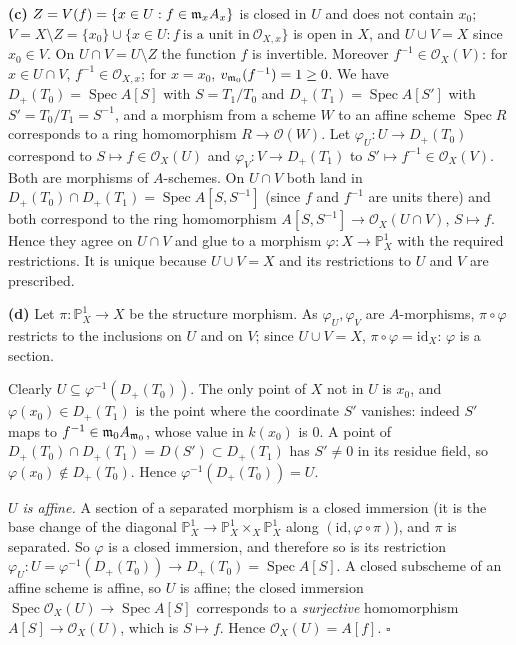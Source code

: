 \documentclass[11pt]{article}
\begin{document}
\textbf{(c)} $Z=V(f)=\{x\in U:f\in\mathfrak m_xA_x\}$ is closed in $U$ and does not contain $x_0$; $V=X\setminus Z=\{x_0\}\cup\{x\in U:f\ \text{is a unit in}\ \mathcal O_{X,x}\}$ is open in $X$, and $U\cup V=X$ since $x_0\in V$. On $U\cap V=U\setminus Z$ the function $f$ is invertible. Moreover $f^{-1}\in\mathcal O_X(V)$: for $x\in U\cap V$, $f^{-1}\in\mathcal O_{X,x}$; for $x=x_0$, $v_{\mathfrak m_0}(f^{-1})=1\ge0$. We have $D_+(T_0)=\operatorname{Spec}A[S]$ with $S=T_1/T_0$ and $D_+(T_1)=\operatorname{Spec}A[S']$ with $S'=T_0/T_1=S^{-1}$, and a morphism from a scheme $W$ to an affine scheme $\operatorname{Spec}R$ corresponds to a ring homomorphism $R\to\mathcal O(W)$. Let $\varphi_U:U\to D_+(T_0)$ correspond to $S\mapsto f\in\mathcal O_X(U)$ and $\varphi_V:V\to D_+(T_1)$ to $S'\mapsto f^{-1}\in\mathcal O_X(V)$. Both are morphisms of $A$-schemes. On $U\cap V$ both land in $D_+(T_0)\cap D_+(T_1)=\operatorname{Spec}A[S,S^{-1}]$ (since $f$ and $f^{-1}$ are units there) and both correspond to the ring homomorphism $A[S,S^{-1}]\to\mathcal O_X(U\cap V)$, $S\mapsto f$. Hence they agree on $U\cap V$ and glue to a morphism $\varphi:X\to\mathbb P^1_X$ with the required restrictions. It is unique because $U\cup V=X$ and its restrictions to $U$ and $V$ are prescribed.

\textbf{(d)} Let $\pi:\mathbb P^1_X\to X$ be the structure morphism. As $\varphi_U,\varphi_V$ are $A$-morphisms, $\pi\circ\varphi$ restricts to the inclusions on $U$ and on $V$; since $U\cup V=X$, $\pi\circ\varphi=\mathrm{id}_X$: $\varphi$ is a section.

Clearly $U\subseteq\varphi^{-1}(D_+(T_0))$. The only point of $X$ not in $U$ is $x_0$, and $\varphi(x_0)\in D_+(T_1)$ is the point where the coordinate $S'$ vanishes: indeed $S'$ maps to $f^{-1}\in\mathfrak m_0A_{\mathfrak m_0}$, whose value in $k(x_0)$ is $0$. A point of $D_+(T_0)\cap D_+(T_1)=D(S')\subset D_+(T_1)$ has $S'\neq0$ in its residue field, so $\varphi(x_0)\notin D_+(T_0)$. Hence $\varphi^{-1}(D_+(T_0))=U$.

\emph{$U$ is affine.} A section of a separated morphism is a closed immersion (it is the base change of the diagonal $\mathbb P^1_X\to\mathbb P^1_X\times_X\mathbb P^1_X$ along $(\mathrm{id},\varphi\circ\pi)$), and $\pi$ is separated. So $\varphi$ is a closed immersion, and therefore so is its restriction $\varphi_U:U=\varphi^{-1}(D_+(T_0))\to D_+(T_0)=\operatorname{Spec}A[S]$. A closed subscheme of an affine scheme is affine, so $U$ is affine; the closed immersion $\operatorname{Spec}\mathcal O_X(U)\to\operatorname{Spec}A[S]$ corresponds to a \emph{surjective} homomorphism $A[S]\to\mathcal O_X(U)$, which is $S\mapsto f$. Hence $\mathcal O_X(U)=A[f]$. \hfill$\square$
\end{document}
